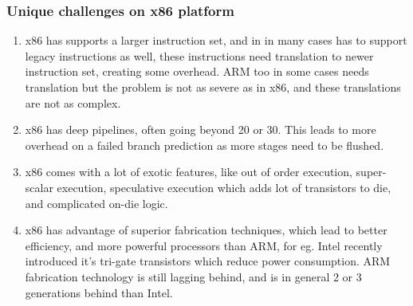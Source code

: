 \documentclass[seminar,twoside]{iitbreport}
\begin{document}
\subsubsection{Unique challenges on x86 platform}

\begin{enumerate}
\item x86 has supports a larger instruction set, and in in many cases has to support legacy instructions as well, these instructions need translation to newer instruction set, creating some overhead. ARM too in some cases needs translation but the problem is not as severe as in x86, and these translations are not as complex.

\item x86 has deep pipelines, often going beyond 20 or 30. This leads to more overhead on a failed branch prediction as more stages need to be flushed.

\item x86 comes with a lot of exotic features, like out of order execution, super-scalar execution, speculative execution which adds lot of transistors to die, and complicated on-die logic.

\item x86 has advantage of superior fabrication techniques, which lead to better efficiency, and more powerful processors than ARM, for eg. Intel recently introduced it's tri-gate transistors which reduce power consumption. ARM fabrication technology is still lagging behind, and is in general 2 or 3 generations behind than Intel.
\end{enumerate}


\end{document}
